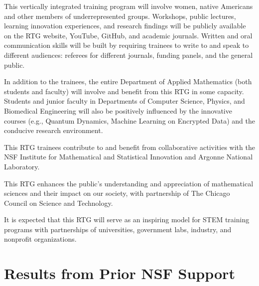 \documentclass[11pt]{NSFamsart}
\begin{document}
This vertically integrated training program will involve women, native Americans and other members of underrepresented groups. Workshops, public lectures, learning innovation experiences, and research findings will be publicly available on the  RTG website, YouTube, GitHub, and academic journals. Written and oral communication skills will be built by requiring trainees to write to and speak to different audiences: referees for different journals, funding panels, and the general public. 

In addition to the   trainees, the entire Department of Applied Mathematics (both students and faculty) will   involve and benefit from this RTG in some capacity.    Students and junior faculty in Departments of Computer Science, Physics, and Biomedical Engineering will also be positively influenced by the innovative courses (e.g., Quantum Dynamics, Machine Learning on Encrypted Data) and the conducive research environment. 
 
This RTG trainees contribute to and benefit from collaborative activities with the NSF Institute for Mathematical and Statistical Innovation  and Argonne National Laboratory. 

This RTG enhances the public’s understanding and appreciation of mathematical sciences     and their impact on our society, with partnership of The Chicago Council on Science and Technology. 
 
It is expected that this RTG will serve as an inspiring model for STEM  training programs with partnerships of universities, government labs, industry, and nonprofit organizations.

 
\section{Results from Prior NSF Support}

 
\end{document}

